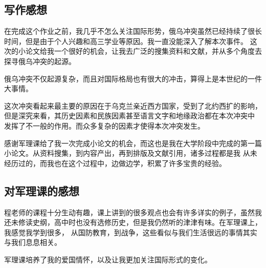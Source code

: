 \subsection{写作感想}
在完成这个作业之前，我几乎不怎么关注国际形势，俄乌冲突虽然已经持续了很长时间，但是由于个人兴趣和高三学业等原因。我一直没能深入了解本次事件。
这次的小论文给我一个很好的机会，让我去广泛的搜集资料和文献，并从多个角度去探寻俄乌冲突的起源。

俄乌冲突不仅起源复杂，而且对国际格局也有很大的冲击，算得上是本世纪的一件大事情。

这次冲突看起来最主要的原因在于乌克兰亲近西方国家，受到了北约西扩的影响，但是深究来看，其历史因素和民族因素甚至语言文字和地缘政治都在本次冲突中
发挥了不一般的作用。而众多复杂的因素才使得本次冲突发生。

感谢军理课给了我一次完成小论文的机会，而这也是我在大学阶段中完成的第一篇小论文。从资料搜集，到内容产出，再到排版及文献引用，诸多过程都是我
从未经历过的，而我也在这个过程中，边做边学，积累了许多宝贵的经验。

\subsection{对军理课的感想}
程老师的课程十分生动有趣，课上讲到的很多观点也会有许多详实的例子，虽然我还未修读史纲，高中时也没有选修历史，但是我仍然听的津津有味。在军理课上，我感觉我学到很多，
从国防教育，到战争，这些看似与我们生活很远的事情其实与我们息息相关。

军理课培养了我的爱国情怀，以及让我更加关注国际形式的变化。